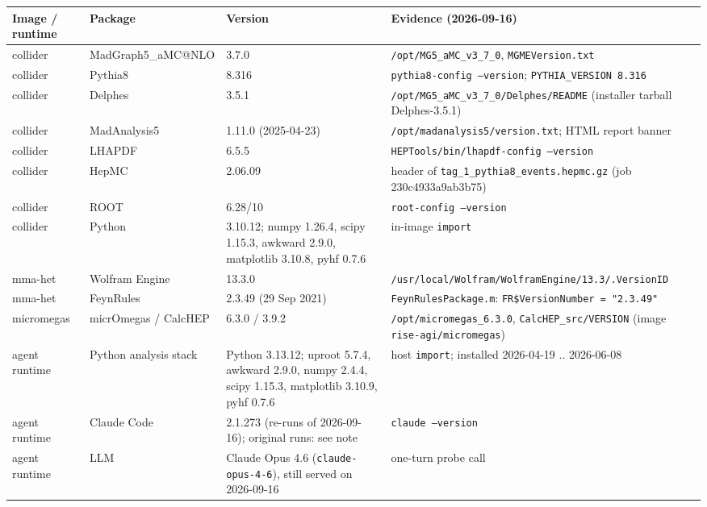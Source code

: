 \documentclass[11pt]{article}
\begin{document}
\begin{center}
\begin{tabular}{lll l}
\toprule
Image / runtime & Package & Version & Evidence (2026-09-16) \\
\midrule
collider & MadGraph5\_aMC@NLO & 3.7.0 & \texttt{/opt/MG5\_aMC\_v3\_7\_0}, \texttt{MGMEVersion.txt} \\
collider & Pythia8 & 8.316 & \texttt{pythia8-config --version}; \texttt{PYTHIA\_VERSION 8.316} \\
collider & Delphes & 3.5.1 & \texttt{/opt/MG5\_aMC\_v3\_7\_0/Delphes/README} (installer tarball Delphes-3.5.1) \\
collider & MadAnalysis5 & 1.11.0 (2025-04-23) & \texttt{/opt/madanalysis5/version.txt}; HTML report banner \\
collider & LHAPDF & 6.5.5 & \texttt{HEPTools/bin/lhapdf-config --version} \\
collider & HepMC & 2.06.09 & header of \texttt{tag\_1\_pythia8\_events.hepmc.gz} (job 230c4933a9ab3b75) \\
collider & ROOT & 6.28/10 & \texttt{root-config --version} \\
collider & Python & 3.10.12; numpy 1.26.4, scipy 1.15.3, awkward 2.9.0, matplotlib 3.10.8, pyhf 0.7.6 & in-image \texttt{import} \\
mma-het & Wolfram Engine & 13.3.0 & \texttt{/usr/local/Wolfram/WolframEngine/13.3/.VersionID} \\
mma-het & FeynRules & 2.3.49 (29 Sep 2021) & \texttt{FeynRulesPackage.m}: \texttt{FR\$VersionNumber = "2.3.49"} \\
micromegas & micrOmegas / CalcHEP & 6.3.0 / 3.9.2 & \texttt{/opt/micromegas\_6.3.0}, \texttt{CalcHEP\_src/VERSION} (image \texttt{rise-agi/micromegas}) \\
agent runtime & Python analysis stack & Python 3.13.12; uproot 5.7.4, awkward 2.9.0, numpy 2.4.4, scipy 1.15.3, matplotlib 3.10.9, pyhf 0.7.6 & host \texttt{import}; installed 2026-04-19 .. 2026-06-08 \\
agent runtime & Claude Code & 2.1.273 (re-runs of 2026-09-16); original runs: see note & \texttt{claude --version} \\
agent runtime & LLM & Claude Opus 4.6 (\texttt{claude-opus-4-6}), still served on 2026-09-16 & one-turn probe call \\
\bottomrule
\end{tabular}
\end{center}
\end{document}
